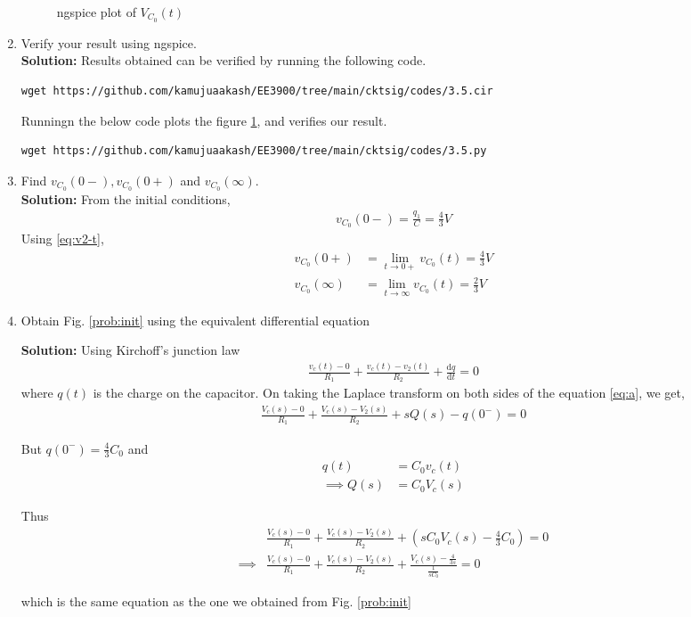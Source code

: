 \documentclass[journal,12pt,twocolumn]{IEEEtran}
\newcommand{\solution}{\noindent \textbf{Solution: }}
\providecommand{\brak}[1]{\ensuremath{\left(#1\right)}}
\providecommand{\der}[1]{\mathrm{d} #1}
\numberwithin{equation}{section}
\renewcommand\thesection{\arabic{section}}
\begin{document}
\begin{enumerate}[label=\arabic*.,ref=\thesection.\theenumi]
\begin{figure}[!ht]
	\caption{ngspice plot of $V_{C_0}(t)$} 
	\label{fig:ngspice2}
\end{figure}
	\item Verify your result using ngspice.\\
	\solution Results obtained can be verified by running the following code.
	\begin{lstlisting}
wget https://github.com/kamujuaakash/EE3900/tree/main/cktsig/codes/3.5.cir
	\end{lstlisting}
Runningn the below code plots the figure \ref{fig:ngspice2}, and verifies our result.
	\begin{lstlisting}
wget https://github.com/kamujuaakash/EE3900/tree/main/cktsig/codes/3.5.py
	\end{lstlisting}



	\item Find $v_{C_0}(0-), v_{C_0}(0+)$ and  $v_{C_0}(\infty) $.\\
\solution From the initial conditions,
\begin{align}
    v_{C_0}(0-) = \frac{q_1}{C} = {\frac{4}{3}}{V}
\end{align}
Using \eqref{eq:v2-t},
\begin{align}
    v_{C_0}(0+) &= \lim_{t \to 0+}v_{C_0}(t) = {\frac{4}{3}}{V} \\
    v_{C_0}(\infty) &= \lim_{t \to \infty}v_{C_0}(t) = {\frac{2}{3}}{V}
\end{align}

\item Obtain Fig. \ref{prob:init} using the equivalent differential equation

\solution Using Kirchoff's junction law
\begin{align}
	\label{eq:a}
	\frac{v_c(t) - 0}{R_1} + \frac{v_c(t) - v_2(t)}{R_2} + \frac{\der{q}}{\der{t}} = 0
\end{align}
where $q(t)$ is the charge on the capacitor.
On taking the Laplace transform on both sides of the equation \eqref{eq:a}, we get,
\begin{align}
	\frac{V_c(s) - 0}{R_1} + \frac{V_c(s) - V_2(s)}{R_2} +sQ(s) - q(0^-) = 0
\end{align}

But $q(0^-) = \frac43 C_0$ and 
\begin{align}
	q(t) &= C_0v_c(t) \\
	\implies Q(s) &= C_0V_c(s)
\end{align}

Thus
\begin{align}
	&\frac{V_c(s) - 0}{R_1} + \frac{V_c(s) - V_2(s)}{R_2} + \brak{sC_0V_c(s) - \frac43 C_0} = 0 \\
	\implies &\frac{V_c(s) - 0}{R_1} + 	\frac{V_c(s) - V_2(s)}{R_2} + \frac{V_c(s) - \frac{4}{3s}}{\frac{1}{sC_0}} = 0 
\end{align}

which is the same equation as the one we obtained from Fig. \ref{prob:init}
\end{enumerate}
	
\end{document}
